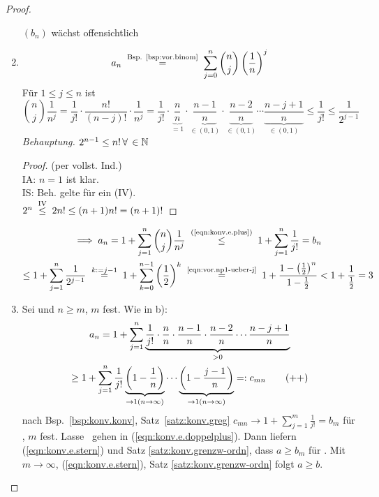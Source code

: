 \documentclass[12pt]{scrreprt}
\begin{document}
\begin{bsp}
\begin{proof}
\begin{enumerate}
      $(b_n)$ wächst offensichtlich
    \item \[a_n \nach{=}{\text{Bsp. \ref{bsp:vor.binom}}}
      \sum_{j=0}^{n}\binom{n}{j}\left(\frac1n\right)^j\] Für $1\le j
      \le n$ ist
      \begin{equation} \label{eqn:konv.e.plus}
        \binom{n}{j}\frac{1}{n^j} =
        \frac{1}{j!}\cdot\frac{n!}{(n-j)!}\cdot\frac{1}{n^j} =
        \frac{1}{j!}\cdot\underbrace{\frac{n}{n}}_{=1}\cdot\underbrace{\frac{n-1}{n}}_{\in(0,1)}\cdot\underbrace{\frac{n-2}{n}}_{\in(0,1)}\dotsm\underbrace{\frac{n-j+1}{n}}_{\in(0,1)}
        \le \frac{1}{j!} \le \frac{1}{2^{j-1}}
        \tag{$+$} \end{equation} \emph{Behauptung.} $2^{n-1}\le
      n!\,\forall\,\in\mathbb{N}$
      \begin{proof} (per vollst. Ind.)\\
        IA: $n=1$ ist klar.\\
        IS: Beh. gelte für ein  (IV).\\
        \folgt $2^n \nach{\le}{IV} 2n! \le (n+1)n! = (n+1)!$
      \end{proof}
      \begin{multline*}
        \folgt a_n=1+\sum_{j=1}^{n}\binom{n}{j}\frac{1}{n^j} \nach{\le}{(\ref{eqn:konv.e.plus})} 1 + \sum_{j=1}^{n} \frac{1}{j!} = b_n\\
        \le 1+\sum_{j=1}^{n} \frac{1}{2^{j-1}} \wegen{=}{k:=j-1} 1 +
        \sum_{k=0}^{n-1} \left(\frac12\right)^k
        \nach{=}{\ref{eqn:vor.np1-ueber-j}}
        1+\frac{1-\left(\frac12\right)^n}{1-\frac12} < 1 +
        \frac{1}{\frac12} = 3
      \end{multline*}
    \item Sei  und $n\ge m$, $m$ fest. Wie in b):
      \begin{multline*} \label{eqn:konv.e.doppelplus}
        a_n=1+\sum_{j=1}^{n}\underbrace{\frac{1}{j!}\cdot\frac{n}{n}\cdot\frac{n-1}{n}\cdot\frac{n-2}{n}\dotsm\frac{n-j+1}{n}}_{>0}\\\ge
        1+\sum_{j=1}^{n}\frac{1}{j!}\underbrace{\left(1-\frac1n\right)}_{\to1(n\rightarrow\infty)}\dotsm\underbrace{\left(1-\frac{j-1}{n}\right)}_{\to1(n\rightarrow\infty)}=:c_{mn}
        \tag{$++$}
      \end{multline*}
      nach Bsp.~\ref{bsp:konv.konv}, Satz~\ref{satz:konv.greg} \folgt
      $\displaystyle c_{mn}\to 1+\sum_{j=1}^{m} \frac{1}{j!}=b_m$ für \ninf, $m$
      fest. Lasse \ninf \ gehen in (\ref{eqn:konv.e.doppelplus}). Dann
      liefern (\ref{eqn:konv.e.stern}) und Satz
      \ref{satz:konv.grenzw-ordn}, dass $a\ge b_m$ für . Mit
      $m\to\infty$, (\ref{eqn:konv.e.stern}), Satz
      \ref{satz:konv.grenzw-ordn} folgt $a\ge b$.
    \end{enumerate}
  \end{proof}
\end{bsp}
\end{document}
